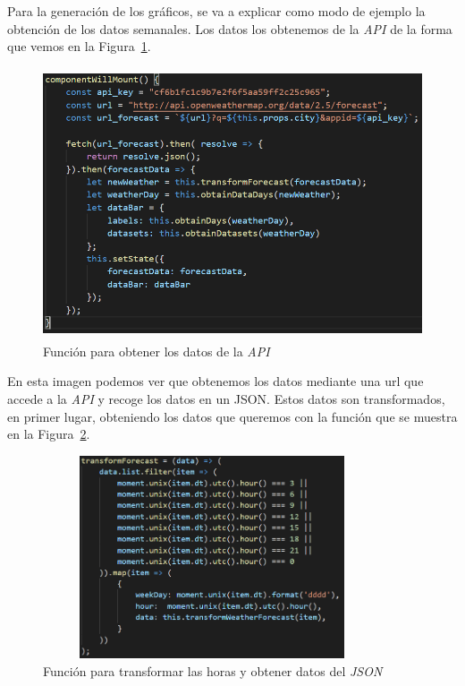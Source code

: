 \documentclass[a4paper, 12pt]{book}
\begin{document}
Para la generación de los gráficos, se va a explicar como modo de ejemplo la obtención de los datos semanales. Los datos los obtenemos de la \textit{API} de la forma que vemos en la Figura~\ref{fig:api_data_week}.
\begin{figure}[h]
  \centering
  \includegraphics[width=12cm, height=8cm]{img_usadas/api_data_week.png}
  \caption{Función para obtener los datos de la \textit{API}}
  \label{fig:api_data_week}
\end{figure}

En esta imagen podemos ver que obtenemos los datos mediante una url que accede a la \textit{API} y recoge los datos en un JSON. Estos datos son transformados, en primer lugar, obteniendo los datos que queremos con la función que se muestra en la Figura~\ref{fig:transform_forecast}.
\begin{figure}[h]
  \centering
  \includegraphics[width=10cm, height=6cm]{img_usadas/transform_forecast.png}
  \caption{Función para transformar las horas y obtener datos del \textit{JSON}}
  \label{fig:transform_forecast}
\end{figure}
\end{document}
